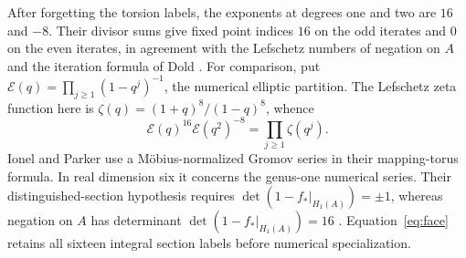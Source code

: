 After forgetting the torsion labels, the exponents at degrees one
and two are $16$ and $-8$. Their divisor sums give fixed point
indices $16$ on the odd iterates and $0$ on the even iterates, in
agreement with the Lefschetz numbers of negation on $A$ and the
iteration formula of Dold \cite{Dold}. For comparison, put
$\mathcal E(q)=\prod_{j\ge1}(1-q^j)^{-1}$, the numerical elliptic
partition. The Lefschetz zeta function here is
$\zeta(q)=(1+q)^8/(1-q)^8$, whence
\[
 \mathcal E(q)^{16}\mathcal E(q^2)^{-8}
          =\prod_{j\ge1}\zeta(q^j).
\]
Ionel and Parker use a M\"obius-normalized Gromov series in their
mapping-torus formula. In real dimension six it concerns the
genus-one numerical series. Their distinguished-section hypothesis
requires $\det(1-f_*|_{H_1(A)})=\pm1$, whereas negation on $A$ has
determinant $\det(1-f_*|_{H_1(A)})=16$
\cite[Theorems~0.1 and~4.1]{IPmaps}. Equation~\eqref{eq:face}
retains all sixteen integral section labels before numerical
specialization.
